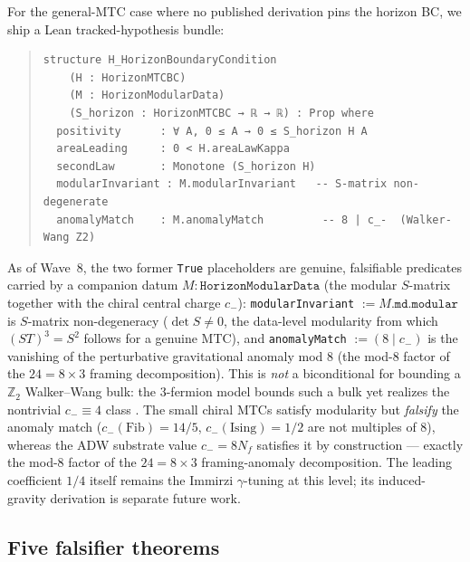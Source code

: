 \documentclass[aps,prd,twocolumn,showpacs,superscriptaddress,nofootinbib]{revtex4-2}
\begin{document}
For the general-MTC case where no published derivation pins the
horizon BC, we ship a Lean tracked-hypothesis bundle:
\begin{quote}\small
\begin{verbatim}
structure H_HorizonBoundaryCondition
    (H : HorizonMTCBC)
    (M : HorizonModularData)
    (S_horizon : HorizonMTCBC → ℝ → ℝ) : Prop where
  positivity      : ∀ A, 0 ≤ A → 0 ≤ S_horizon H A
  areaLeading     : 0 < H.areaLawKappa
  secondLaw       : Monotone (S_horizon H)
  modularInvariant : M.modularInvariant   -- S-matrix non-degenerate
  anomalyMatch    : M.anomalyMatch         -- 8 | c_-  (Walker-Wang Z2)
\end{verbatim}
\end{quote}
As of Wave~8, the two former \texttt{True} placeholders are genuine,
falsifiable predicates carried by a companion datum
$M : \texttt{HorizonModularData}$ (the modular $S$-matrix together with the
chiral central charge $c_-$): \texttt{modularInvariant} $:= M.\texttt{md.modular}$
is $S$-matrix non-degeneracy ($\det S \neq 0$, the data-level modularity from
which $(ST)^3 = S^2$ follows for a genuine MTC), and \texttt{anomalyMatch}
$:= (8 \mid c_-)$ is the vanishing of the perturbative gravitational anomaly
mod 8 (the mod-8 factor of the $24 = 8\times3$ framing decomposition). This is
\emph{not} a biconditional for bounding a $\mathbb{Z}_2$ Walker--Wang bulk: the
3-fermion model bounds such a bulk yet realizes the nontrivial $c_-\equiv4$ class
\cite{WalkerWang2012}. The small chiral MTCs
satisfy modularity but \emph{falsify} the anomaly match ($c_-(\mathrm{Fib}) = 14/5$,
$c_-(\mathrm{Ising}) = 1/2$ are not multiples of $8$), whereas the ADW substrate
value $c_- = 8 N_f$ satisfies it by construction --- exactly the mod-$8$ factor of
the $24 = 8 \times 3$ framing-anomaly decomposition. The leading coefficient $1/4$
itself remains the Immirzi $\gamma$-tuning at this level; its induced-gravity
derivation is separate future work.

\subsection{Five falsifier theorems}
\end{document}
